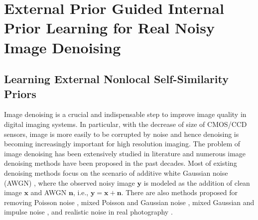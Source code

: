 %
\chapter{External Prior Guided Internal Prior Learning for Real Noisy Image Denoising}
\label{sec:guided}

\section{Learning External Nonlocal Self-Similarity Priors}
\label{sec:system:intro}

Image denoising is a crucial and indispensable step to improve image quality in digital imaging systems. In particular, with the decrease of size of CMOS/CCD sensors, image is more easily to be corrupted by noise and hence denoising is becoming increasingly important for high resolution imaging. The problem of image denoising has been extensively studied in literature and numerous image denoising methods
\cite{bayesshrink,curvelet,ksvd,lssc,ncsr,bm3d,cbm3d,
zhou2012nonparametric,Tomasi1998,blsgsm,nlm,nlbayes,wnnm,pgpd,foe,epll,
mlp,xie2012image,dncnn,
barbu2009training,csf,chen2015learning,Fadili,salmon2014,
Foipractical,Luisier,makitalo2013optimal,Montagner,
jiang2014mixed,Hu2016,xuaccv2016,
fullyblind,rabie2005robust,Liu2008,almapg,noiseclinic,
ncwebsite,Zhu_2016_CVPR,crosschannel2016,neatimage}
have been proposed in the past decades. Most of existing denoising methods focus on the scenario of additive white Gaussian noise (AWGN) 
\cite{bayesshrink,curvelet,ksvd,lssc,ncsr,bm3d,cbm3d,
zhou2012nonparametric,Tomasi1998,blsgsm,nlm,nlbayes,wnnm,pgpd,foe,epll,
mlp,xie2012image,dncnn,barbu2009training,csf,chen2015learning}, where the observed noisy image $\mathbf{y}$ is modeled as the addition of clean image $\mathbf{x}$ and AWGN $\mathbf{n}$, i.e., $\mathbf{y}=\mathbf{x}+\mathbf{n}$. There are also methods proposed for removing Poisson noise \cite{Fadili,salmon2014}, mixed Poisson and Gaussian noise \cite{Foipractical,Luisier,makitalo2013optimal,Montagner}, mixed Gaussian and impulse noise \cite{jiang2014mixed,Hu2016,xuaccv2016}, and realistic noise in real photography \cite{fullyblind,rabie2005robust,Liu2008,almapg,Zhu_2016_CVPR,noiseclinic,
ncwebsite,crosschannel2016,neatimage}.

